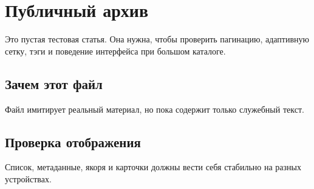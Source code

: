 \section{Публичный архив}

Это пустая тестовая статья. Она нужна, чтобы проверить пагинацию, адаптивную сетку, тэги и поведение интерфейса при большом каталоге.

\subsection{Зачем этот файл}

Файл имитирует реальный материал, но пока содержит только служебный текст.

\subsection{Проверка отображения}

Список, метаданные, якоря и карточки должны вести себя стабильно на разных устройствах.
